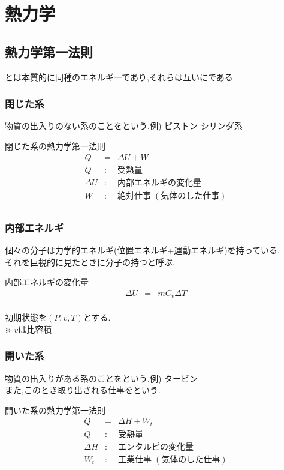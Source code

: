 \documentclass[a4paper]{jsarticle}
\begin{document}
\section{熱力学}
\subsection{熱力学第一法則}
\begin{screen}
    \begin{center}
        とは本質的に同種のエネルギーであり,それらは互いにである
    \end{center}
\end{screen}
\subsubsection{閉じた系}
物質の出入りのない系のことをという.\quad 例) ピストン-シリンダ系
\begin{itembox}[l]{閉じた系の熱力学第一法則}
    \begin{eqnarray*}
        Q&=&\Delta U+W\\
        Q&:&受熱量\\
        \Delta U&:&内部エネルギの変化量\\
        W&:&絶対仕事 \; (気体のした仕事)\\
    \end{eqnarray*}
\end{itembox}
\subsubsection{内部エネルギ}
個々の分子は力学的エネルギ(位置エネルギ+運動エネルギ)を持っている.\\
それを巨視的に見たときに分子の持つと呼ぶ.
\begin{itembox}[l]{内部エネルギの変化量}
    \begin{eqnarray*}
        \Delta U&=&mC_v\Delta T\\
    \end{eqnarray*}
\end{itembox}
初期状態を$\left(P,v,T\right)$とする.\\
※ $v$は比容積
\subsubsection{開いた系}
物質の出入りがある系のことをという.\quad 例) タービン\\
また,このとき取り出される仕事をという.
\begin{itembox}[l]{開いた系の熱力学第一法則}
    \begin{eqnarray*}
        Q&=&\Delta H+W_t\\
        Q&:&受熱量\\
        \Delta H&:&エンタルピの変化量\\
        W_t&:&工業仕事 \; (気体のした仕事)\\
    \end{eqnarray*}
\end{itembox}
\end{document}
